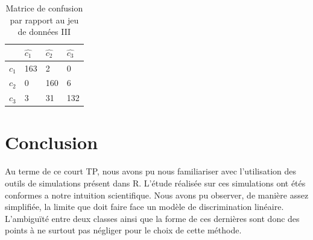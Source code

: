 	\begin{table}[H]
		\centering
		\begin{tabular}{|l|l|l|l|}
			\hline
			\textbf{}   & \textbf{$\hat{c_1}$} & \textbf{$\hat{c_2}$}  & \textbf{$\hat{c_3}$} \\ \hline
			\textbf{$c_1$} & 163         & 2           & 0           \\ \hline
			\textbf{$c_2$} & 0           & 160         & 6           \\ \hline
			\textbf{$c_3$} & 3         & 31           & 132           \\ \hline
			
		\end{tabular}
		\caption{Matrice de confusion par rapport au jeu de données III}
	\end{table}
	
	
\section{Conclusion}
\paragraph{}
Au terme de ce court TP, nous avons pu nous familiariser avec l'utilisation des outils de simulations présent dans R. L'étude réalisée sur ces simulations ont étés conformes a notre intuition scientifique. Nous avons pu observer, de manière assez simplifiée, la limite que doit faire face un modèle de discrimination linéaire. L'ambiguïté entre deux classes ainsi que la forme de ces dernières sont donc des points à ne surtout pas négliger pour le choix de cette méthode. 